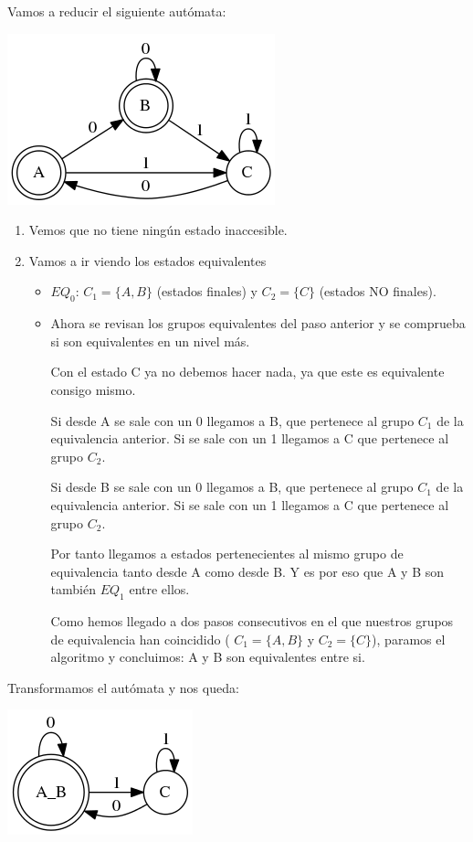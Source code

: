 \documentclass{apuntes}
\begin{document}
\begin{example}
Vamos a reducir el siguiente autómata:

\begin{center}
\includegraphics[scale=0.4]{automataFinal1.png}
\end{center}

\begin{enumerate}
\item Vemos que no tiene ningún estado inaccesible.
\item Vamos a ir viendo los estados equivalentes
\begin{itemize}
\item $EQ_0$: $C_1=\{A,B\}$ (estados finales) y $C_2=\{C\}$ (estados NO finales).
\item Ahora se revisan los grupos equivalentes del paso anterior y se comprueba si son equivalentes en un nivel más.

Con el estado C ya no debemos hacer nada, ya que este es equivalente consigo mismo.

Si desde A se sale con un 0 llegamos a B, que pertenece al grupo $C_1$ de la equivalencia anterior. Si se sale con un 1 llegamos a C que pertenece al grupo $C_2$.

Si desde B se sale con un 0 llegamos a B, que pertenece al grupo $C_1$ de la equivalencia anterior. Si se sale con un 1 llegamos a C que pertenece al grupo $C_2$.

Por tanto llegamos a estados pertenecientes al mismo grupo de equivalencia tanto desde A como desde B. Y es por eso que A y B son también $EQ_1$ entre ellos.

Como hemos llegado a dos pasos consecutivos en el que nuestros grupos de equivalencia han coincidido ( $C_1=\{A,B\}$ y $C_2=\{C\}$), paramos el algoritmo y concluimos: A y B son equivalentes entre si.
\end{itemize}
\end{enumerate}

Transformamos el autómata y nos queda:

\begin{center}
\includegraphics[scale=0.4]{automataFinal2.png}
\end{center}

\end{example}
\end{document}
